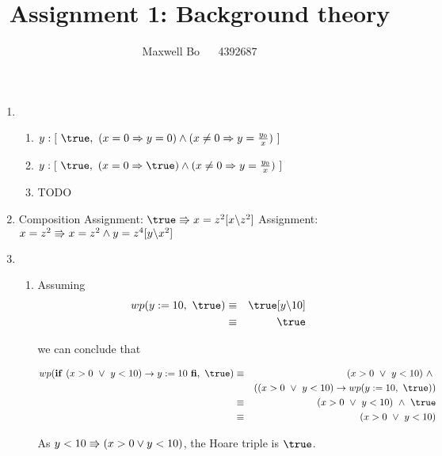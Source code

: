 \documentclass{article}
\title{\bf Assignment 1: Background theory}
\author{Maxwell Bo  ~~ 4392687}
\begin{document}
\maketitle

\begin{enumerate}
\item 
    \begin{enumerate}
    \item $y: [\ \true,\ (x = 0 \Rightarrow y = 0) \land (x \neq 0  \Rightarrow y = \frac{y_0}{x})\ ]$
    \item $y: [\ \true,\ (x = 0 \Rightarrow \true) \land (x \neq 0  \Rightarrow y = \frac{y_0}{x})\ ]$
    \item TODO
    \end{enumerate}

\item 
    \DERIVE
     {Composition}
     {Assignment: $\true \entails x = z^2 [x \backslash z^2]$}
     {Assignment: $x = z^2 \Rrightarrow x = z^2 \land y = z ^ 4[y \backslash x^2]$}
    \ENDDERIVE

\item
    \begin{enumerate}
    \item Assuming
        \begin{eqnarray*}
            wp(y := 10,\ \true) & \equiv & \true[y \backslash 10]\\
                               & \equiv & \true
        \end{eqnarray*} 

        we can conclude that 

        \begin{eqnarray*}
            wp(\If~ (x > 0 ~\lor~ y < 10) \rightarrow y:= 10\ \Fi,\ \true) & \equiv & (x > 0 ~\lor~ y < 10) ~\land~ \\
                & & ((x > 0 ~\lor~ y < 10) \rightarrow wp(y := 10,\ \true))\\
            & \equiv & (x > 0 ~\lor~ y < 10) ~\land~ \true\\
            & \equiv & (x > 0 ~\lor~ y < 10)
        \end{eqnarray*}

        As $y < 10 \Rrightarrow (x > 0 \lor y < 10)$, the Hoare triple is $\true$.


\end{enumerate}
\end{enumerate}
\end{document}
